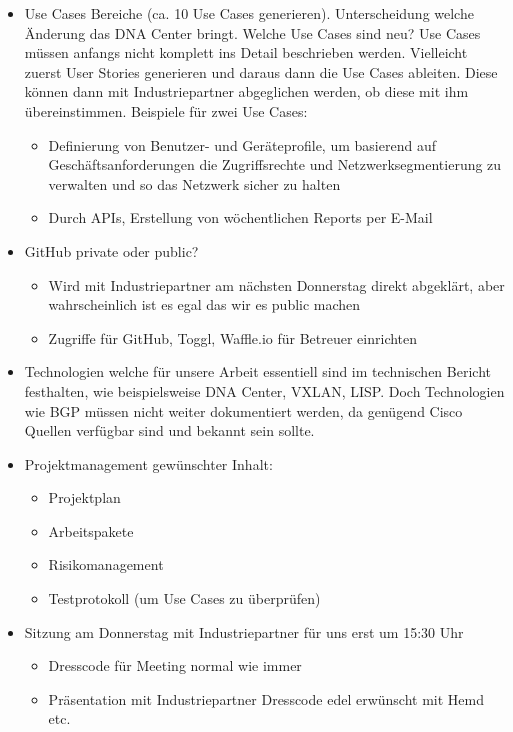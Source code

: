 \begin{itemize}	
	\item Use Cases Bereiche (ca. 10 Use Cases generieren). Unterscheidung welche Änderung das DNA Center bringt. Welche Use Cases sind neu? Use Cases müssen anfangs nicht komplett ins Detail beschrieben werden. Vielleicht zuerst User Stories generieren und daraus dann die Use Cases ableiten. Diese können dann mit Industriepartner abgeglichen werden, ob diese mit ihm übereinstimmen. Beispiele für zwei Use Cases:
	\begin{itemize}
		\item Definierung von Benutzer- und Geräteprofile, um basierend auf Geschäftsanforderungen die Zugriffsrechte und Netzwerksegmentierung zu verwalten und so das Netzwerk sicher zu halten
		\item Durch APIs, Erstellung von wöchentlichen Reports per E-Mail
	\end{itemize}
	\item GitHub private oder public?
	\begin{itemize}
		\item Wird mit Industriepartner am nächsten Donnerstag direkt abgeklärt, aber wahrscheinlich ist es egal das wir es public machen
		\item Zugriffe für GitHub, Toggl, Waffle.io für Betreuer einrichten
	\end{itemize} 
	\item Technologien welche für unsere Arbeit essentiell sind im technischen Bericht festhalten, wie beispielsweise DNA Center, VXLAN, LISP. Doch Technologien wie BGP müssen nicht weiter dokumentiert werden, da genügend Cisco Quellen verfügbar sind und bekannt sein sollte.
	\item Projektmanagement gewünschter Inhalt:
	\begin{itemize}
		\item Projektplan
		\item Arbeitspakete
		\item Risikomanagement
		\item Testprotokoll (um Use Cases zu überprüfen)
	\end{itemize}
	\item Sitzung am Donnerstag mit Industriepartner für uns erst um 15:30 Uhr
	\begin{itemize}
		\item Dresscode für Meeting normal wie immer
		\item Präsentation mit Industriepartner Dresscode edel erwünscht mit Hemd etc.
	\end{itemize}

\end{itemize}
